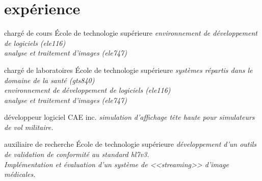 \documentclass[]{friggeri-cv}
\newif\ifenglish
\begin{document}
\ifenglish\section{experience}\else\section{expérience}\fi

\begin{entrylist}
  \ifenglish
    \entry {2009-2014} {lecturer} {École de technologie supérieure} {\emph{software development environment (ele{\footnotesize116})\\image processing and analysis (ele{\footnotesize747})}}
  \else
     {chargé de cours} {École de technologie supérieure} {\emph{environnement de développement de logiciels (ele{\footnotesize116})\\analyse et traitement d'images (ele{\footnotesize747})}}
  \fi

  \ifenglish
    \entry {2009-2014} {teaching assistants} {École de technologie supérieure} {\emph{healthcare distributed systems (gts{\footnotesize840})\\software development environment (ele{\footnotesize116})\\image processing and analysis (ele{\footnotesize747})}}
  \else
     {chargé de laboratoires} {École de technologie supérieure} {\emph{systèmes répartis dans le domaine de la santé (gts{\footnotesize840})\\environnement de développement de logiciels (ele{\footnotesize116})\\analyse et traitement d'images (ele{\footnotesize747})}}
  \fi

  \ifenglish
    \entry {2009} {software developer} {CAE inc.} {\emph{head-up display simulation for military flight simulators.}}
  \else
     {développeur logiciel} {CAE inc.} {\emph{simulation d'affichage tête haute pour simulateurs de vol militaire.}}
  \fi

  \ifenglish
    \entry {2006-2008} {research assistant} {École de technologie supérieure} {\emph{development standard compliance tool for hl{\small7}v{\small3}.\\implementation and evaluation of a medical image streaming software.}}
  \else
     {auxiliaire de recherche} {École de technologie supérieure} {\emph{développement d'un outils de validation de conformité au standard hl{\small7}v{\small3}.\\Implémentation et évaluation d'un système de <<streaming>> d'image médicales.}}
  \fi
\end{entrylist}
\end{document}
